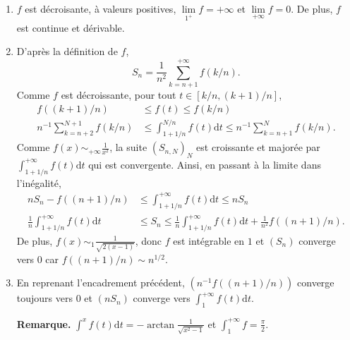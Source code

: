 \begin{elem_sol}
\begin{enumerate}
\item $f$ est décroisante, à valeurs positives, $\lim\limits_{1^+} f = +\infty$ et $\lim\limits_{+\infty} f = 0$. De plus, $f$ est continue et dérivable.

\item D'après la définition de $f$,
\[
S_n = \frac{1}{n^2} \sum\limits_{k=n+1}^{+\infty} f(k/n).
\]
Comme $f$ est décroissante, pour tout $t \in [k/n,(k+1)/n]$,
\begin{align*}
f((k+1)/n) &\leq f(t) \leq f(k/n) \\
n^{-1} \sum\limits_{k=n+2}^{N+1} f(k/n) &\leq \displaystyle\int_{1+1/n}^{N/n} f(t) \mathrm{d}t \leq n^{-1} \sum\limits_{k=n+1}^{N} f(k/n).
\end{align*}
Comme $f(x) \sim_{+\infty} \frac{1}{x^2}$, la suite $(S_{n,N})_N$ est croissante et majorée par $\displaystyle\int_{1+1/n}^{+\infty} f(t) \mathrm{d}t$ qui est convergente. Ainsi, en passant à la limite dans l'inégalité,
\begin{align*}
n S_n - f((n+1)/n) &\leq \displaystyle\int_{1+1/n}^{+\infty} f(t) \mathrm{d}t \leq n S_n \\
\frac{1}{n} \displaystyle\int_{1+1/n}^{+\infty} f(t) \mathrm{d}t &\leq S_n \leq \frac{1}{n} \displaystyle\int_{1+1/n}^{+\infty} f(t) \mathrm{d}t + \frac{1}{n^2} f((n+1)/n).
\end{align*}
De plus, $f(x) \sim_1 \frac{1}{\sqrt{2 (x - 1)}}$, donc $f$ est intégrable en $1$ et $(S_n)$ converge vers $0$ car $f((n+1)/n) \sim n^{1/2}$.

\item En reprenant l'encadrement précédent, $\left(n^{-1} f((n+1)/n)\right)$ converge toujours vers $0$ et $(n S_n)$ converge vers $\displaystyle\int_1^{+\infty} f(t) \mathrm{d}t$.

\textbf{Remarque.} $\displaystyle\int^x f(t) \mathrm{d}t = - \arctan\frac{1}{\sqrt{x^2 - 1}}$ et $\displaystyle\int_1^{+\infty} f = \frac{\pi}{2}$.
\end{enumerate}
\end{elem_sol}